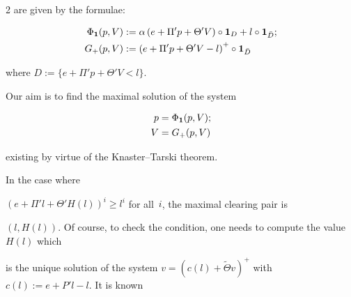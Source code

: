 \begin{multicols}{2}
are given by the formulae: 

\begin{align*}

 \Phi_{\bf 1}(p, V)&: = \alpha \left(e +  \Pi' p +  \Theta' V\right) \circ {\bf 1}_{D} + l \circ {\bf 1}_{\bar D}; \\

G_+(p, V) &:= \left(e + \Pi' p + \Theta' V - l\right)^+ \circ {\bf 1}_{\bar D}

\end{align*}

where $D := \{ e + \Pi' p + \Theta' V <  l  \}$. 



Our aim is to find the maximal solution of the  system 



\vspace*{-4pt}



\noindent

\begin{align*}


p&=\Phi_{\bf 1}(p, V) ; \\


V&=G_+(p, V) 

\end{align*}



\vspace*{-4pt}



\noindent

existing by virtue of the Knaster--Tarski theorem. 



In the case where 

 $(e + \Pi' l + \Theta' H(l))^i \ge   l^i $ for all~$i$,    the maximal clearing pair  is 

$(l,H(l))$. Of course, to check the condition,  one needs to compute the value $H(l)$ which 

is the unique solution of the system  $v=(c(l)+\tilde \Theta v)^+$ with $c(l):=e+P'l-l$.  It is known\linebreak\vspace*{-12pt}



\columnbreak



\noindent


\end{multicols}
